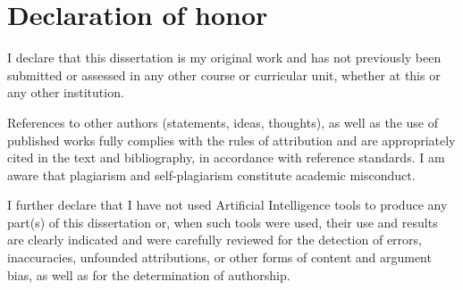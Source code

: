 \chapter*{Declaration of honor}

I declare that this dissertation is my original work and has 
not previously been submitted or assessed in any other course or 
curricular unit, whether at this or any other institution.


References to other authors (statements, ideas, thoughts), as well 
as the use of published works fully complies with the rules of 
attribution and are appropriately cited in the text and bibliography, 
in accordance with reference standards. 
I am aware that plagiarism and self-plagiarism constitute 
academic misconduct.


I further declare that I have not used Artificial Intelligence tools 
to produce any part(s) of this dissertation or, when such tools 
were used, their use and results are clearly indicated and were 
carefully reviewed for the detection of errors, inaccuracies, 
unfounded attributions, or other forms of content and argument bias, 
as well as for the determination of authorship.



